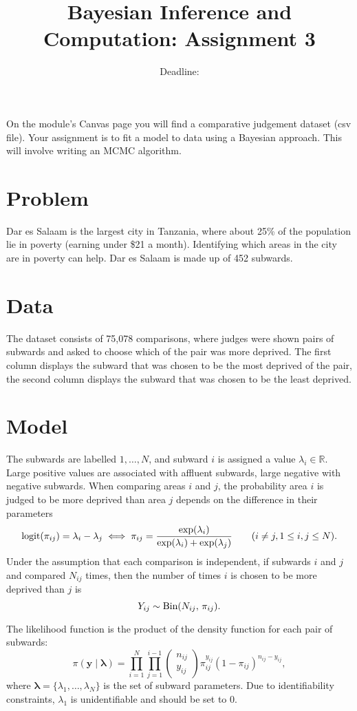 \documentclass{article}
\title{Bayesian Inference and Computation: Assignment 3}
\date{Deadline: }
\begin{document}
\maketitle

On the module's Canvas page you will find a comparative judgement dataset (csv file). Your assignment is to fit a model to data using a Bayesian approach. This will involve writing an MCMC algorithm. 

\section{Problem}
Dar es Salaam is the largest city in Tanzania, where about 25\% of the population lie in poverty (earning under \$21 a month). Identifying which areas in the city are in poverty can help. Dar es Salaam is made up of 452 subwards. 

\section{Data} 
The dataset consists of 75,078 comparisons, where judges were shown pairs of subwards and asked to choose which of the pair was more deprived. The first column displays the subward that was chosen to be the most deprived of the pair, the second column displays the subward that was chosen to be the least deprived. 

\section{Model}
The subwards are labelled $1, \ldots, N$, and subward $i$ is assigned a value $\lambda_i \in \mathbb{R}$. Large positive values are associated with affluent subwards, large negative with negative subwards. When comparing areas $i$ and $j$, the probability area $i$ is judged to be more deprived than area $j$ depends on the difference in their parameters
$$
    \hbox{logit}(\pi_{ij}) = \lambda_i - \lambda_j \iff \pi_{ij} = \frac{\exp(\lambda_i)}{\exp(\lambda_i) + \exp(\lambda_j)} \qquad (i \neq j, 1\leq i, j \leq N).
$$
Under the assumption that each comparison is independent, if subwards $i$ and $j$ and compared $N_{ij}$ times, then the number of times $i$ is chosen to be more deprived than $j$ is 
$$
Y_{ij} \sim \hbox{Bin}(N_{ij},\, \pi_{ij}).
$$

The likelihood function is the product of the density function for each pair of subwards: 
$$
  \pi(\boldsymbol{y}\mid\boldsymbol{\lambda}) = \prod_{i=1}^N\prod_{j=1}^{i-1} \begin{pmatrix} n_{ij} \\ y_{ij}
\end{pmatrix} \pi_{ij}^{y_{ij}} (1-\pi_{ij})^{n_{ij} - y_{ij}}, 
$$
where $\boldsymbol{\lambda} = \{\lambda_1, \ldots, \lambda_N\}$ is the set of subward parameters. Due to identifiability constraints, $\lambda_1$ is unidentifiable and should be set to 0. 
\end{document}
